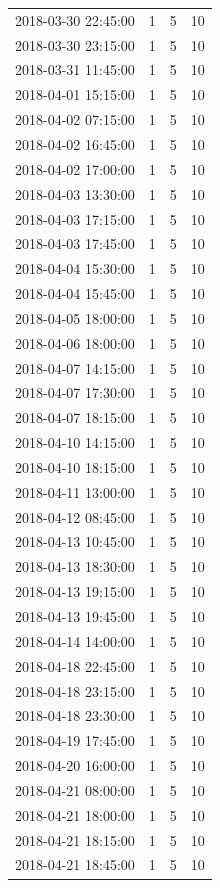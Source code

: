\begin{tabular}{lrrr}
2018-03-30 22:45:00 & 1 & 5 & 10 \\
2018-03-30 23:15:00 & 1 & 5 & 10 \\
2018-03-31 11:45:00 & 1 & 5 & 10 \\
2018-04-01 15:15:00 & 1 & 5 & 10 \\
2018-04-02 07:15:00 & 1 & 5 & 10 \\
2018-04-02 16:45:00 & 1 & 5 & 10 \\
2018-04-02 17:00:00 & 1 & 5 & 10 \\
2018-04-03 13:30:00 & 1 & 5 & 10 \\
2018-04-03 17:15:00 & 1 & 5 & 10 \\
2018-04-03 17:45:00 & 1 & 5 & 10 \\
2018-04-04 15:30:00 & 1 & 5 & 10 \\
2018-04-04 15:45:00 & 1 & 5 & 10 \\
2018-04-05 18:00:00 & 1 & 5 & 10 \\
2018-04-06 18:00:00 & 1 & 5 & 10 \\
2018-04-07 14:15:00 & 1 & 5 & 10 \\
2018-04-07 17:30:00 & 1 & 5 & 10 \\
2018-04-07 18:15:00 & 1 & 5 & 10 \\
2018-04-10 14:15:00 & 1 & 5 & 10 \\
2018-04-10 18:15:00 & 1 & 5 & 10 \\
2018-04-11 13:00:00 & 1 & 5 & 10 \\
2018-04-12 08:45:00 & 1 & 5 & 10 \\
2018-04-13 10:45:00 & 1 & 5 & 10 \\
2018-04-13 18:30:00 & 1 & 5 & 10 \\
2018-04-13 19:15:00 & 1 & 5 & 10 \\
2018-04-13 19:45:00 & 1 & 5 & 10 \\
2018-04-14 14:00:00 & 1 & 5 & 10 \\
2018-04-18 22:45:00 & 1 & 5 & 10 \\
2018-04-18 23:15:00 & 1 & 5 & 10 \\
2018-04-18 23:30:00 & 1 & 5 & 10 \\
2018-04-19 17:45:00 & 1 & 5 & 10 \\
2018-04-20 16:00:00 & 1 & 5 & 10 \\
2018-04-21 08:00:00 & 1 & 5 & 10 \\
2018-04-21 18:00:00 & 1 & 5 & 10 \\
2018-04-21 18:15:00 & 1 & 5 & 10 \\
2018-04-21 18:45:00 & 1 & 5 & 10 \\

\end{tabular}

